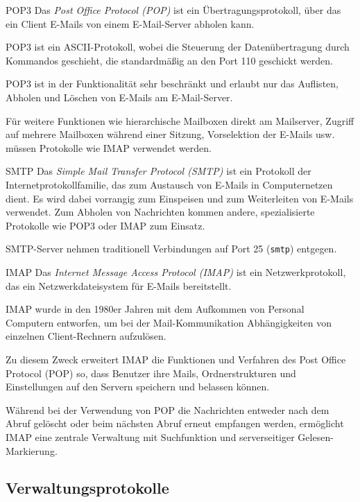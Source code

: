 \begin{bonus}{POP3}
    Das \emph{Post Office Protocol (POP)} ist ein Übertragungsprotokoll, über das ein Client E-Mails von einem E-Mail-Server abholen kann.

    POP3 ist ein ASCII-Protokoll, wobei die Steuerung der Datenübertragung durch Kommandos geschieht, die standardmäßig an den Port 110 geschickt werden.

    POP3 ist in der Funktionalität sehr beschränkt und erlaubt nur das Auflisten, Abholen und Löschen von E-Mails am E-Mail-Server.

    Für weitere Funktionen wie hierarchische Mailboxen direkt am Mailserver, Zugriff auf mehrere Mailboxen während einer Sitzung, Vorselektion der E-Mails usw. müssen Protokolle wie IMAP verwendet werden.
\end{bonus}

\begin{bonus}{SMTP}
    Das \emph{Simple Mail Transfer Protocol (SMTP)}  ist ein Protokoll der Internetprotokollfamilie, das zum Austausch von E-Mails in Computernetzen dient. Es wird dabei vorrangig zum Einspeisen und zum Weiterleiten von E-Mails verwendet. Zum Abholen von Nachrichten kommen andere, spezialisierte Protokolle wie POP3 oder IMAP zum Einsatz.

    SMTP-Server nehmen traditionell Verbindungen auf Port 25 (\texttt{smtp}) entgegen.
\end{bonus}

\begin{bonus}{IMAP}
    Das \emph{Internet Message Access Protocol (IMAP)} ist ein Netzwerkprotokoll, das ein Netzwerkdateisystem für E-Mails bereitstellt.

    IMAP wurde in den 1980er Jahren mit dem Aufkommen von Personal Computern entworfen, um bei der Mail-Kommunikation Abhängigkeiten von einzelnen Client-Rechnern aufzulösen.

    Zu diesem Zweck erweitert IMAP die Funktionen und Verfahren des Post Office Protocol (POP) so, dass Benutzer ihre Mails, Ordnerstrukturen und Einstellungen auf den Servern speichern und belassen können.

    Während bei der Verwendung von POP die Nachrichten entweder nach dem Abruf gelöscht oder beim nächsten Abruf erneut empfangen werden, ermöglicht IMAP eine zentrale Verwaltung mit Suchfunktion und serverseitiger Gelesen-Markierung.
\end{bonus}

\subsection{Verwaltungsprotokolle}

